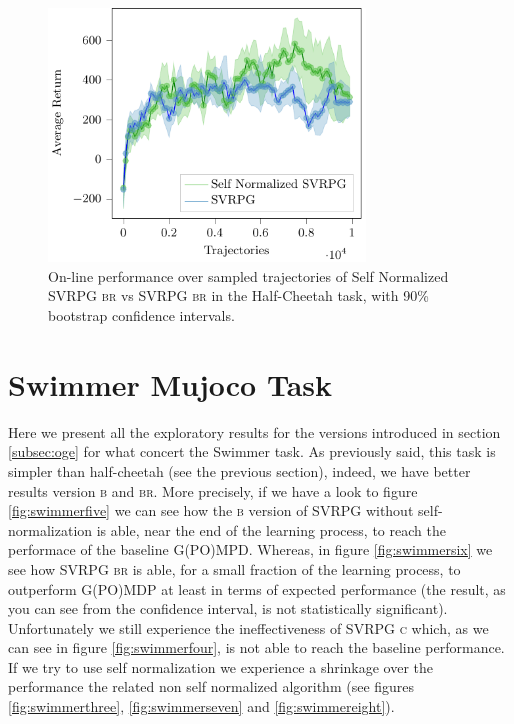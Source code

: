 \begin{figure}[h]
	\begin{minipage}[h]{1\textwidth}
		\centering
		\includegraphics[width=0.75\textwidth]{Images/Experiments/half_cheetah_SVRPG_vs_SN_SVRPG_B_reuse.pdf}
		\vspace{-0.1in}
		\caption{On-line performance over sampled trajectories of Self Normalized \acs{SVRPG} \textsc{br} vs \acs{SVRPG} \textsc{br} in the Half-Cheetah task, with 90\% bootstrap confidence intervals.}
		\label{fig:hceleven}
	\end{minipage}
	\vspace{-0.15in}
\end{figure}

\clearpage
\section{Swimmer Mujoco Task}
\vspace{-0.05in}
Here we present all the exploratory results for the versions introduced in section \ref{subsec:oge} for what concert the Swimmer task. As previously said, this task is simpler than half-cheetah (see the previous section), indeed, we have better results \wrt version \textsc{b} and \textsc{br}. More precisely, if we have a look to figure \ref{fig:swimmerfive} we can see how the \textsc{b} version of \acs{SVRPG} without self-normalization is able, near the end of the learning process, to reach the performace of the baseline G(PO)MPD. Whereas, in figure \ref{fig:swimmersix} we see how \acs{SVRPG} \textsc{br} is able, for a small fraction of the learning process, to outperform G(PO)MDP at least in terms of expected performance (the result, as you can see from the confidence interval, is not statistically significant). Unfortunately we still experience the ineffectiveness of \acs{SVRPG} \textsc{c} which, as we can see in figure \ref{fig:swimmerfour}, is not able to reach the baseline performance. If we try to use self normalization we experience a shrinkage over the performance \wrt the related non self normalized algorithm (see figures \ref{fig:swimmerthree}, \ref{fig:swimmerseven} and \ref{fig:swimmereight}).

